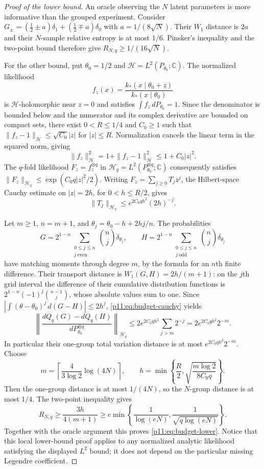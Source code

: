 \documentclass[11pt,letterpaper]{article}
\theoremstyle{definition}
\theoremstyle{remark}
\newcommand{\1}{\mathbf 1}
\begin{document}
\begin{proof}[Proof of the lower bound]
An oracle observing the $N$ latent parameters is more informative than
the grouped experiment.  Consider
$G_\pm=(\frac12\pm a)\delta_1+(\frac12\mp a)\delta_0$ with
$a=1/(8\sqrt N)$.  Their $W_1$ distance is $2a$ and their
$N$-sample relative entropy is at most $1/6$.
Pinsker's inequality and the two-point bound therefore give
$R_{N,q}\ge1/(16\sqrt N)$.

For the other bound, put $\theta_0=1/2$ and
$\mathcal H=L^2(P_{\theta_0};\mathbb C)$.
The normalized likelihood
\[
 f_z(x)=\frac{k_*(x\mid\theta_0+z)}{k_*(x\mid\theta_0)}
\]
is $\mathcal H$-holomorphic near $z=0$ and satisfies
$\int f_z\,dP_{\theta_0}=1$.
Since the denominator is bounded below and the numerator and its
complex derivative are bounded on compact sets, there exist
$0<R\le1/4$ and $C_0\ge1$ such that
$\|f_z-1\|_{\mathcal H}\le\sqrt{C_0}|z|$ for $|z|\le R$.
Normalization cancels the linear term in the squared norm, giving
\[
 \|f_z\|_{\mathcal H}^2=1+\|f_z-1\|_{\mathcal H}^2
      \le1+C_0|z|^2.
\]
The $q$-fold likelihood $F_z=f_z^{\otimes q}$ in
$\mathcal H_q=L^2(P_{\theta_0}^{\otimes q};\mathbb C)$ consequently
satisfies $\|F_z\|_{\mathcal H_q}\le\exp(C_0q|z|^2/2)$.
Writing $F_z=\sum_{j\ge0}T_jz^j$, the Hilbert-space Cauchy estimate
on $|z|=2h$, for $0<h\le R/2$, gives
\begin{equation}\label{p11:eq:budget-cauchy}
 \|T_j\|_{\mathcal H_q}\le
           e^{2C_0qh^2}(2h)^{-j}.
\end{equation}

Let $m\ge1$, $n=m+1$, and $\theta_j=\theta_0-h+2hj/n$.
The probabilities
\[
 G=2^{1-n}\sum_{\substack{0\le j\le n\\j\ \mathrm{even}}}
            \binom nj\delta_{\theta_j},\qquad
 H=2^{1-n}\sum_{\substack{0\le j\le n\\j\ \mathrm{odd}}}
            \binom nj\delta_{\theta_j}
\]
have matching moments through degree $m$, by the formula for an
$n$th finite difference.  Their transport distance is
$W_1(G,H)=2h/(m+1)$: on the $j$th grid interval the difference of their
cumulative distribution functions is
$2^{1-n}(-1)^j\binom{n-1}{j}$, whose absolute values sum to one.
Since $|\int(\theta-\theta_0)^j\,d(G-H)|\le2h^j$,
\eqref{p11:eq:budget-cauchy} yields
\[
 \left\|\frac{dQ_q(G)-dQ_q(H)}{dP_{\theta_0}^{\otimes q}}
       \right\|_{\mathcal H_q}
 \le2e^{2C_0qh^2}\sum_{j>m}2^{-j}
 =2e^{2C_0qh^2}2^{-m}.
\]
In particular their one-group total variation distance is at most
$e^{2C_0qh^2}2^{-m}$.
Choose
\[
 m=\left\lceil\frac4{3\log2}\log(4N)\right\rceil,
 \qquad h=\min\left\{\frac R2,
             \sqrt{\frac{m\log2}{8C_0q}}\right\}.
\]
Then the one-group distance is at most $1/(4N)$, so the
$N$-group distance is at most $1/4$.
The two-point inequality gives
\[
 R_{N,q}\ge\frac{3h}{4(m+1)}
 \ge c\min\left\{\frac1{\log(eN)},
                    \frac1{\sqrt{q\log(eN)}}\right\}.
\]
Together with the oracle argument this proves \eqref{p11:eq:budget-lower}.
Notice that this local lower-bound proof applies to any normalized
analytic likelihood satisfying the displayed $L^2$ bound; it does
not depend on the particular missing Legendre coefficient.
\end{proof}
\end{document}
